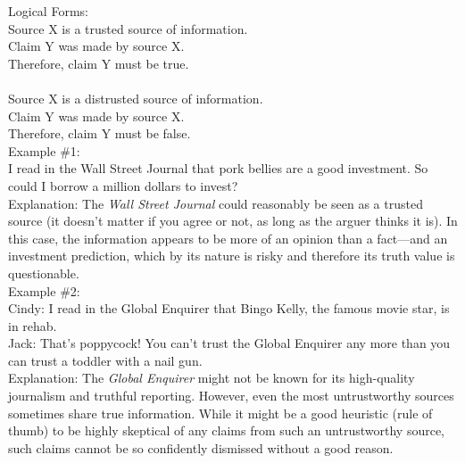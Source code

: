 \documentclass[a4paper,12pt,single,pdftex]{scrartcl}
\begin{document}
    
      Logical Forms:
    \\

    
      Source X is a trusted source of information.
    \\

    
      Claim Y was made by source X.
    \\

    
      Therefore, claim Y must be true.
    \\

    
       
    \\

    
      Source X is a distrusted source of information.
    \\

    
      Claim Y was made by source X.
    \\

    
      Therefore, claim Y must be false.
    \\

    
      Example \#1:
    \\

    
      I read in the Wall Street Journal that pork bellies are a good investment. So could I borrow a million dollars to invest?
    \\

    
      Explanation: The {\it Wall Street Journal} could reasonably be seen as a trusted source (it doesn't matter if you agree or not, as long as the arguer thinks it is). In this case, the information appears to be more of an opinion than a fact—and an investment prediction, which by its nature is risky and therefore its truth value is questionable.
    \\

    
      Example \#2:
    \\

    
      Cindy: I read in the Global Enquirer that Bingo Kelly, the famous movie star, is in rehab.
    \\

    
      Jack: That's poppycock! You can't trust the Global Enquirer any more than you can trust a toddler with a nail gun.
    \\

    
      Explanation: The {\it Global Enquirer} might not be known for its high-quality journalism and truthful reporting. However, even the most untrustworthy sources sometimes share true information. While it might be a good heuristic (rule of thumb) to be highly skeptical of any claims from such an untrustworthy source, such claims cannot be so confidently dismissed without a good reason.
    \\
\end{document}
